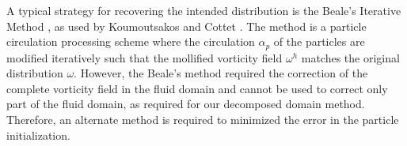 A typical strategy for recovering the intended distribution is the Beale's Iterative Method \cite{Beale1988}, as used by Koumoutsakos and Cottet \cite{Cottet2000a}. The method is a particle circulation processing scheme where the circulation $\alpha_p$ of the particles are modified iteratively such that the mollified vorticity field $\omega^h$ matches the original distribution $\omega$. However, the Beale's method required the correction of the complete vorticity field in the fluid domain and cannot be used to correct only part of the fluid domain, as required for our decomposed domain method. Therefore, an alternate method is required to minimized the error in the particle initialization.

